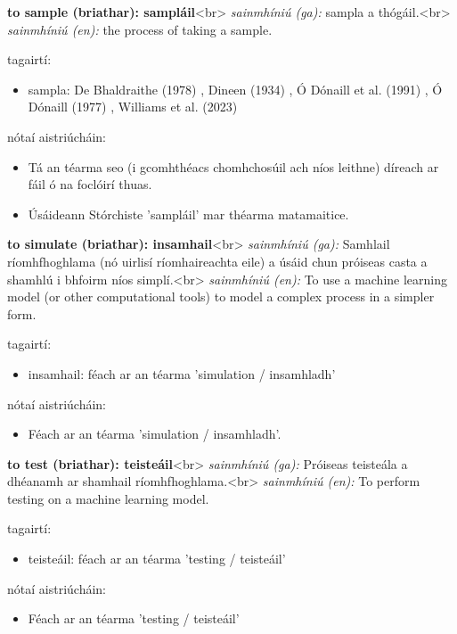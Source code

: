 \documentclass{article}
\begin{document}
\textbf{to sample (briathar): sampláil}<br>
\textit{sainmhíniú (ga):} sampla a thógáil.<br>
\textit{sainmhíniú (en):} the process of taking a sample.

tagairtí:
\begin{itemize}
	\item sampla: De Bhaldraithe (1978) \cite{de-bhaldraithe}, Dineen (1934) \cite{dineen}, Ó Dónaill et al. (1991) \cite{focloir-beag}, Ó Dónaill (1977) \cite{odonaill}, Williams et al. (2023) \cite{storchiste}
\end{itemize}

nótaí aistriúcháin:
\begin{itemize}
	\item Tá an téarma seo (i gcomhthéacs chomhchosúil ach níos leithne) díreach ar fáil ó na foclóirí thuas.
	\item Úsáideann Stórchiste 'sampláil' mar théarma matamaitice.
\end{itemize}


\textbf{to simulate (briathar): insamhail}<br>
\textit{sainmhíniú (ga):} Samhlail ríomhfhoghlama (nó uirlisí ríomhaireachta eile) a úsáid chun próiseas casta a shamhlú i bhfoirm níos simplí.<br>
\textit{sainmhíniú (en):} To use a machine learning model (or other computational tools) to model a complex process in a simpler form.

tagairtí:
\begin{itemize}
	\item insamhail: féach ar an téarma 'simulation / insamhladh'
\end{itemize}

nótaí aistriúcháin:
\begin{itemize}
	\item Féach ar an téarma 'simulation / insamhladh'.
\end{itemize}


\textbf{to test (briathar): teisteáil}<br>
\textit{sainmhíniú (ga):} Próiseas teisteála a dhéanamh ar shamhail ríomhfhoghlama.<br>
\textit{sainmhíniú (en):} To perform testing on a machine learning model.

tagairtí:
\begin{itemize}
	\item teisteáil: féach ar an téarma 'testing / teisteáil'
\end{itemize}

nótaí aistriúcháin:
\begin{itemize}
	\item Féach ar an téarma 'testing / teisteáil'
\end{itemize}
\end{document}
